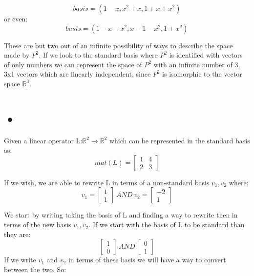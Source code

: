 \documentclass[12pt]{article}
\begin{document}
$$basis = (1-x, x^2 + x, 1 + x + x^2) $$
or even:
$$ basis = (1- x - x^2, x -1 - x^2, 1 + x^2) $$

These are but two out of an infinite possibility of ways to describe the space made by $P^2$. If we look to the standard basis where $P^2$ is identified with vectors of only numbers we can represent the space of $P^2$ with an infinite number of 3, 3x1 vectors which are linearly independent, since $P^2$ is isomorphic to the vector space $\mathbb{R}^3$.

\section{•}

Given a linear operator L:$\mathbb{R}^2 \rightarrow \mathbb{R}^2$ which can be represented in the standard basis as:
\[
mat(L) = 
\begin{bmatrix}
1 & 4\\
2 & 3
\end{bmatrix}
\]

If we wish, we are able to rewrite L in terms of a non-standard basis $v_1, v_2$ where:
\[
v_1 = 
\begin{bmatrix}
1\\
1
\end{bmatrix}
\ AND\
v_2 = 
\begin{bmatrix}
-2\\
1
\end{bmatrix}
\]

We start by writing taking the basis of L and finding a way to rewrite then in terms of the new basis $v_1, v_2$. If we start with the basis of L to be standard than they are:
\[
\begin{bmatrix}
1\\
0
\end{bmatrix}
\ AND\ 
\begin{bmatrix}
0\\
1
\end{bmatrix}
\]
If we write $v_1$ and $v_2$ in terms of these basis we will have a way to convert between the two. So:
\end{document}
